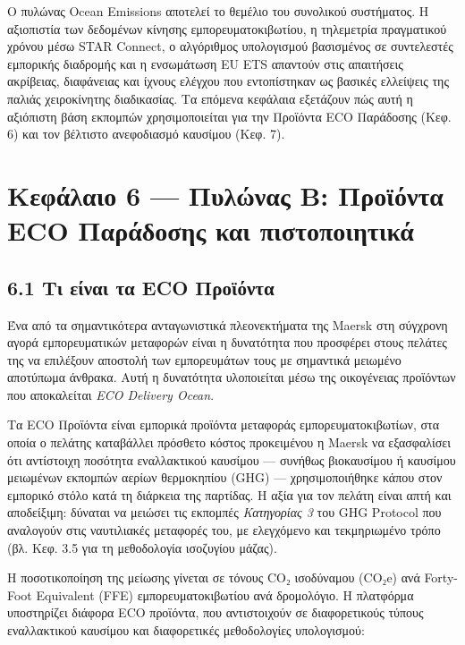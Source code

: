 \documentclass[11pt,a4paper,greek,twoside]{template-xe}
\begin{document}
Ο πυλώνας Ocean Emissions αποτελεί το θεμέλιο του συνολικού συστήματος.
Η αξιοπιστία των δεδομένων κίνησης εμπορευματοκιβωτίου, η τηλεμετρία
πραγματικού χρόνου μέσω STAR Connect, ο αλγόριθμος υπολογισμού
βασισμένος σε συντελεστές εμπορικής διαδρομής και η ενσωμάτωση EU ETS
απαντούν στις απαιτήσεις ακρίβειας, διαφάνειας και ίχνους ελέγχου που
εντοπίστηκαν ως βασικές ελλείψεις της παλιάς χειροκίνητης διαδικασίας.
Τα επόμενα κεφάλαια εξετάζουν πώς αυτή η αξιόπιστη βάση εκπομπών
χρησιμοποιείται για την Προϊόντα ECO Παράδοσης (Κεφ. 6) και τον βέλτιστο
ανεφοδιασμό καυσίμου (Κεφ. 7).

\pagebreak

\chapter{Κεφάλαιο 6 --- Πυλώνας Β: Προϊόντα ECO Παράδοσης και
πιστοποιητικά}\label{ux3baux3b5ux3c6ux3acux3bbux3b1ux3b9ux3bf-6-ux3c0ux3c5ux3bbux3ceux3bdux3b1ux3c2-ux3b2-ux3c0ux3c1ux3bfux3caux3ccux3bdux3c4ux3b1-eco-ux3c0ux3b1ux3c1ux3acux3b4ux3bfux3c3ux3b7ux3c2-ux3baux3b1ux3b9-ux3c0ux3b9ux3c3ux3c4ux3bfux3c0ux3bfux3b9ux3b7ux3c4ux3b9ux3baux3ac}

\section{6.1 Τι είναι τα ECO
Προϊόντα}\label{ux3c4ux3b9-ux3b5ux3afux3bdux3b1ux3b9-ux3c4ux3b1-eco-ux3c0ux3c1ux3bfux3caux3ccux3bdux3c4ux3b1}

Ένα από τα σημαντικότερα ανταγωνιστικά πλεονεκτήματα της Maersk στη
σύγχρονη αγορά εμπορευματικών μεταφορών είναι η δυνατότητα που προσφέρει
στους πελάτες της να επιλέξουν αποστολή των εμπορευμάτων τους με
σημαντικά μειωμένο αποτύπωμα άνθρακα. Αυτή η δυνατότητα υλοποιείται μέσω
της οικογένειας προϊόντων που αποκαλείται \emph{ECO Delivery Ocean}.

Τα ECO Προϊόντα είναι εμπορικά προϊόντα μεταφοράς εμπορευματοκιβωτίων,
στα οποία ο πελάτης καταβάλλει πρόσθετο κόστος προκειμένου η Maersk να
εξασφαλίσει ότι αντίστοιχη ποσότητα εναλλακτικού καυσίμου --- συνήθως
βιοκαυσίμου ή καυσίμου μειωμένων εκπομπών αερίων θερμοκηπίου (GHG) ---
χρησιμοποιήθηκε κάπου στον εμπορικό στόλο κατά τη διάρκεια της παρτίδας.
Η αξία για τον πελάτη είναι απτή και αποδείξιμη: δύναται να μειώσει τις
εκπομπές \emph{Κατηγορίας 3} του GHG Protocol που αναλογούν στις
ναυτιλιακές μεταφορές του, με ελεγχόμενο και τεκμηριωμένο τρόπο (βλ.
Κεφ. 3.5 για τη μεθοδολογία ισοζυγίου μάζας).

Η ποσοτικοποίηση της μείωσης γίνεται σε τόνους CO₂ ισοδύναμου (CO₂e) ανά
Forty-Foot Equivalent (FFE) εμπορευματοκιβωτίου ανά δρομολόγιο. Η
πλατφόρμα υποστηρίζει διάφορα ECO προϊόντα, που αντιστοιχούν σε
διαφορετικούς τύπους εναλλακτικού καυσίμου και διαφορετικές μεθοδολογίες
υπολογισμού:
\end{document}
